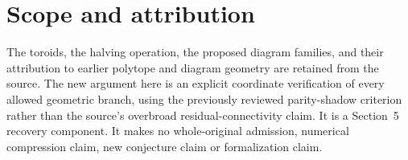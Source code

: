 \section{Scope and attribution}
The toroids, the halving operation, the proposed diagram families,
and their attribution to earlier polytope and diagram geometry are
retained from the source. The new argument here is an explicit
coordinate verification of every allowed geometric branch, using
the previously reviewed parity-shadow criterion rather than the
source's overbroad residual-connectivity claim. It is a Section~5
recovery component. It makes no whole-original admission, numerical
compression claim, new conjecture claim or formalization claim.
